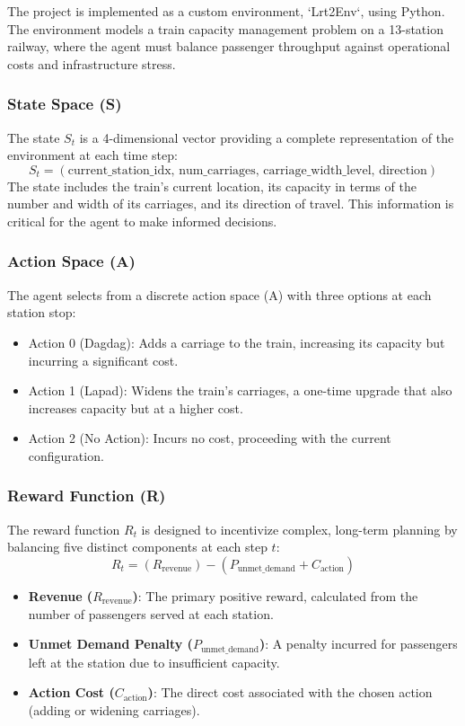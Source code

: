 \documentclass{article}
\begin{document}
The project is implemented as a custom environment, `Lrt2Env`, using Python. The environment models a train capacity management problem on a 13-station railway, where the agent must balance passenger throughput against operational costs and infrastructure stress.

\subsubsection{State Space (S)}

The state \(S_t\) is a 4-dimensional vector providing a complete representation of the environment at each time step:
\begin{equation}
    S_t = (\text{current\_station\_idx, num\_carriages, carriage\_width\_level, direction})
\end{equation}
The state includes the train's current location, its capacity in terms of the number and width of its carriages, and its direction of travel. This information is critical for the agent to make informed decisions.

\subsubsection{Action Space (A)}

The agent selects from a discrete action space (A) with three options at each station stop:
\begin{itemize}
    \item Action 0 (Dagdag): Adds a carriage to the train, increasing its capacity but incurring a significant cost.
    \item Action 1 (Lapad): Widens the train's carriages, a one-time upgrade that also increases capacity but at a higher cost.
    \item Action 2 (No Action): Incurs no cost, proceeding with the current configuration.
\end{itemize}

\subsubsection{Reward Function (R)}

The reward function \(R_t\) is designed to incentivize complex, long-term planning by balancing five distinct components at each step \(t\):
\begin{equation}
    R_t = (R_{\text{revenue}}) - (P_{\text{unmet\_demand}} + C_{\text{action}})
\end{equation}
\begin{itemize}
    \item \textbf{Revenue (\(R_{\text{revenue}}\))}: The primary positive reward, calculated from the number of passengers served at each station.
    \item \textbf{Unmet Demand Penalty (\(P_{\text{unmet\_demand}}\))}: A penalty incurred for passengers left at the station due to insufficient capacity.
    \item \textbf{Action Cost (\(C_{\text{action}}\))}: The direct cost associated with the chosen action (adding or widening carriages).
\end{itemize}
\end{document}

